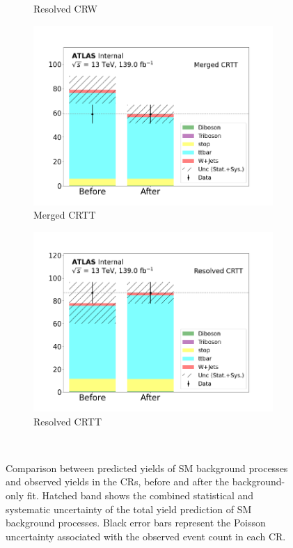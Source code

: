 \begin{figure}[h]
\begin{subfigure}{0.45\textwidth}
    \caption{Resolved CRW}\label{fig:before_after_CRW_resolved}
  \end{subfigure} \vspace{1em}
  \begin{subfigure}{0.45\textwidth}
    \includegraphics[width=\textwidth]{Figures/8/CRTT_Merged_before_after.pdf}
    \caption{Merged CRTT}\label{fig:before_after_CRTT_merged}
  \end{subfigure} \hspace{1em}
  \begin{subfigure}{0.45\textwidth}
    \includegraphics[width=\textwidth]{Figures/8/CRTT_Resolved_before_after.pdf}
    \caption{Resolved CRTT}\label{fig:before_after_CRTT_resolved}
  \end{subfigure} \\ \vspace{1em}
  \caption[]{Comparison between predicted yields of SM background processes and observed yields in the CRs, before and after the background-only fit. Hatched band shows the combined statistical and systematic uncertainty of the total yield prediction of SM background processes. Black error bars represent the Poisson uncertainty associated with the observed event count in each CR.}
  \label{fig:before_after_CRs}
\end{figure}

